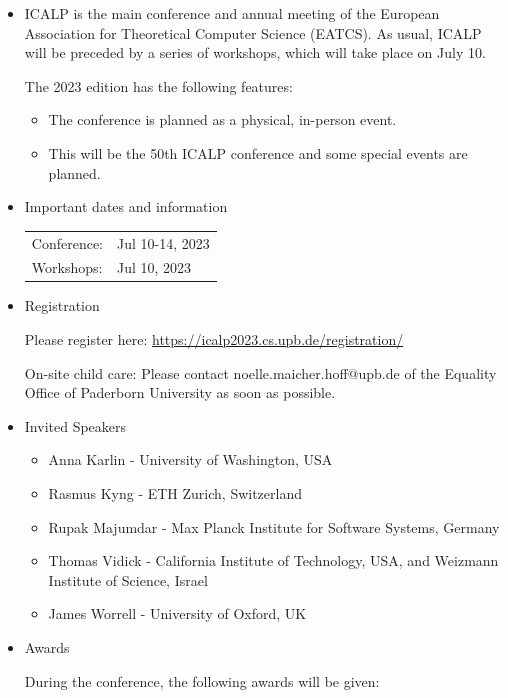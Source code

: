 \documentclass[prodmode,acmtecs]{acmsmall} %
\begin{document}
\begin{itemize}\item  ICALP is the main conference and annual meeting of the European Association for Theoretical Computer Science (EATCS). As usual, ICALP will be preceded by a series of workshops, which will take place on July 10. 
 
  The 2023 edition has the following features: 
 
\begin{itemize}\item  The conference is planned as a physical, in-person event.
\item  This will be the 50th ICALP conference and some special events are planned.
\end{itemize} 
\item  Important dates and information 
 
\begin{tabulary}{\linewidth}{LL}Conference:  & Jul 10-14, 2023 \\
Workshops:  & Jul 10, 2023 \\
\end{tabulary}
 
\item  Registration 
 
  Please register here: \href{https://icalp2023.cs.upb.de/registration/}{https://icalp2023.cs.upb.de/registration/} 
 
  On-site child care: Please contact noelle.maicher.hoff@upb.de of the Equality Office of Paderborn University as soon as possible. 
 
\item  Invited Speakers 
 
\begin{itemize}\item  Anna Karlin - University of Washington, USA
\item  Rasmus Kyng - ETH Zurich, Switzerland
\item  Rupak Majumdar - Max Planck Institute for Software Systems, Germany
\item  Thomas Vidick - California Institute of Technology, USA, and Weizmann Institute of Science, Israel
\item  James Worrell - University of Oxford, UK
\end{itemize} 
\item  Awards 
 
  During the conference, the following awards will be given: 
 

\end{itemize}
\end{document}

